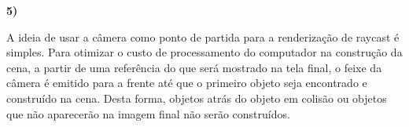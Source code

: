 \textbf{5)} 

A ideia de usar a câmera como ponto de partida 
para a renderização de raycast é simples. Para
otimizar o custo de processamento do computador 
na construção da cena, a partir de uma referência 
do que será mostrado na tela final, o feixe da 
câmera é emitido para a frente até que o primeiro 
objeto seja encontrado e construído na cena. Desta
forma, objetos atrás do objeto em colisão ou 
objetos que não aparecerão na imagem final não 
serão construídos.
